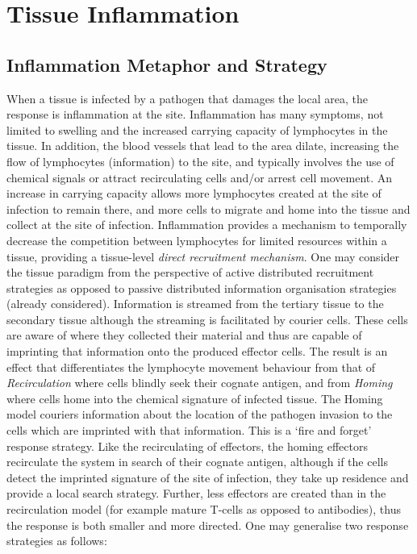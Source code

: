 %
%
\section{Tissue Inflammation}
\label{sec:tissues:recruitment}

%
%
\subsection{Inflammation Metaphor and Strategy}
When a tissue is infected by a pathogen that damages the local area, the response is inflammation at the site. Inflammation has many symptoms, not limited to swelling and the increased carrying capacity of lymphocytes in the tissue. In addition, the blood vessels that lead to the area dilate, increasing the flow of lymphocytes (information) to the site, and typically involves the use of chemical signals or attract recirculating cells and/or arrest cell movement. An increase in carrying capacity allows more lymphocytes created at the site of infection to remain there, and more cells to migrate and home into the tissue and collect at the site of infection. 
Inflammation provides a mechanism to temporally decrease the competition between lymphocytes for limited resources within a tissue, providing a tissue-level \emph{direct recruitment mechanism}. 
One may consider the tissue paradigm from the perspective of active distributed recruitment strategies as opposed to passive distributed information organisation strategies (already considered). Information is streamed from the tertiary tissue to the secondary tissue although the streaming is facilitated by courier cells. These cells are aware of where they collected their material and thus are capable of imprinting that information onto the produced effector cells. The result is an effect that differentiates the lymphocyte movement behaviour from that of \emph{Recirculation} where cells blindly seek their cognate antigen, and from \emph{Homing} where cells home into the chemical signature of infected tissue. The Homing model couriers information about the location of the pathogen invasion to the cells which are imprinted with that information. This is a `fire and forget' response strategy. Like the recirculating of effectors, the homing effectors recirculate the system in search of their cognate antigen, although if the cells detect the imprinted signature of the site of infection, they take up residence and provide a local search strategy. Further, less effectors are created than in the recirculation model (for example mature T-cells as opposed to antibodies), thus the response is both smaller and more directed. One may generalise two response strategies as follows:

